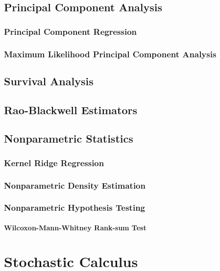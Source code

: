 \documentclass[11pt]{report} %
\begin{document}
\section{Principal Component Analysis}

\subsection{Principal Component Regression}

\subsection{Maximum Likelihood Principal Component Analysis \cite{Bishop2006}}

\section{Survival Analysis}

\section{Rao-Blackwell Estimators}

\section{Nonparametric Statistics}

\subsection{Kernel Ridge Regression}

\subsection{Nonparametric Density Estimation}

\subsection{Nonparametric Hypothesis Testing}

\subsubsection{Wilcoxon-Mann-Whitney Rank-sum Test}

\chapter{Stochastic Calculus}
\end{document}
